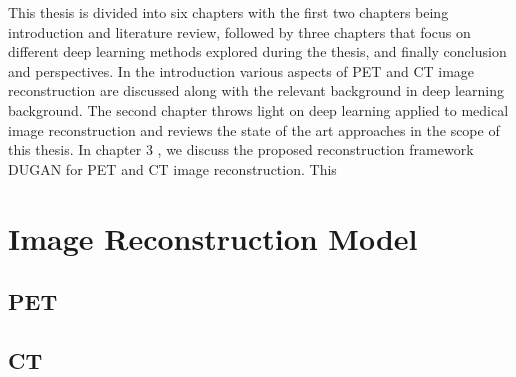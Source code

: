 This thesis is divided into six chapters with the first two chapters being introduction and literature review, followed by three chapters that focus on different deep learning methods explored during the thesis, and finally conclusion and perspectives. In the introduction various aspects of \ac{PET} and \ac{CT} image reconstruction are discussed along with the relevant background in deep learning background. The second chapter throws light on deep learning applied to medical image reconstruction and reviews the state of the art approaches in the scope of this thesis. 
In chapter 3 , we discuss the proposed reconstruction framework \ac{DUGAN} for \ac{PET} and \ac{CT} image reconstruction. This  


\section{Image Reconstruction Model}



\subsection{PET}


\subsection{CT}









